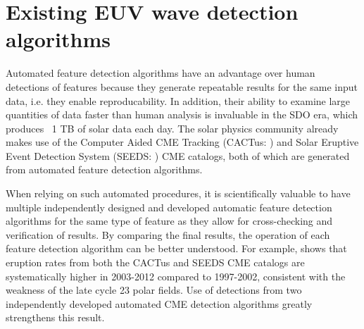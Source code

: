 \section{Existing EUV wave detection algorithms}\label{sec:existing}

Automated feature detection algorithms have an advantage over human detections of features because
they generate repeatable results for the same input data, i.e. they enable reproducability. In addition, their ability to examine large quantities of data faster than human analysis is invaluable in the SDO era, which produces ~1 TB of solar data each day. The solar physics community already makes use of the Computer Aided CME Tracking (CACTus: \cite{2004A&A...425.1097R}) and Solar Eruptive Event
Detection System (SEEDS: \cite{2008SoPh..248..485O}) CME catalogs,
both of which are generated from automated feature detection
algorithms. 

When relying on such automated procedures, it is scientifically valuable to have multiple independently designed and developed automatic feature detection algorithms for the same type of
feature as they allow for cross-checking and verification of results.
By comparing the final results, the operation of each feature
detection algorithm can be better understood. For example, \cite{2013ApJ...768..162P} shows that
eruption rates from both the CACTus and SEEDS CME catalogs are
systematically higher in 2003-2012 compared to 1997-2002, consistent
with the weakness of the late cycle 23 polar fields.  Use of
detections from two independently developed automated CME detection
algorithms greatly strengthens this result.

